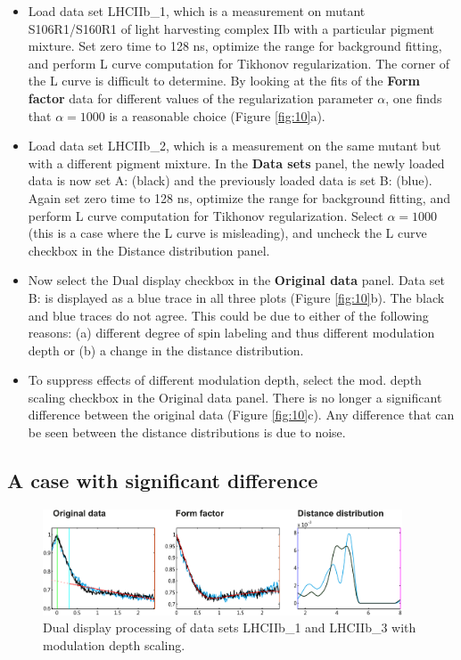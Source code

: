 \documentclass[11pt,a4paper]{article}
\begin{document}
\begin{itemize}
	\item Load data set {\ttfamily LHCIIb\_1}, which is a measurement on mutant S106R1/S160R1 of light harvesting complex IIb with a particular pigment mixture. Set zero time to 128 ns, optimize the range for background fitting, and perform L curve computation for Tikhonov regularization. The corner of the L curve is difficult to determine. By looking at the fits of the {\ttfamily \bf Form factor} data for different values of the regularization parameter $\alpha$, one finds that $\alpha = 1000$ is a reasonable choice (Figure \ref{fig:10}a).
	\item Load data set {\ttfamily LHCIIb\_2}, which is a measurement on the same mutant but with a different pigment mixture. In the {\ttfamily \bf Data sets} panel, the newly loaded data is now set {\ttfamily A:} (black) and the previously loaded data is set {\ttfamily B:} (blue). Again set zero time to 128 ns, optimize the range for background fitting, and perform L curve computation for Tikhonov regularization. Select $\alpha = 1000$ (this is a case where the L curve is misleading), and uncheck the {\ttfamily L curve} checkbox in the {\ttfamily Distance distribution} panel. 
	\item Now select the {\ttfamily Dual display} checkbox in the {\ttfamily \bf Original data} panel. Data set {\ttfamily B:} is displayed as a blue trace in all three plots (Figure \ref{fig:10}b). The black and blue traces do not agree. This could be due to either of the following reasons: (a) different degree of spin labeling and thus different modulation depth or (b) a change in the distance distribution.
	\item To suppress effects of different modulation depth, select the {\ttfamily mod. depth scaling} checkbox in the {\ttfamily Original data} panel. There is no longer a significant difference between the original data (Figure \ref{fig:10}c). Any difference that can be seen between the distance distributions is due to noise.    
\end{itemize}

\subsection{A case with significant difference}

\begin{figure}[ht]
 \vspace{10mm}
 	\begin{center}
		\includegraphics[width=0.95\textwidth]{figure11.pdf}
	\end{center}
	\caption{Dual display processing of data sets {\ttfamily LHCIIb\_1} and {\ttfamily LHCIIb\_3} with modulation depth scaling.}
	\label{fig:11}
\end{figure}
\end{document}
